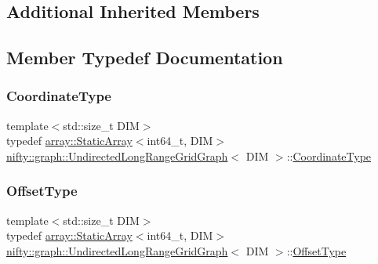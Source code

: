 \subsection*{Additional Inherited Members}


\subsection{Member Typedef Documentation}
\mbox{\label{classnifty_1_1graph_1_1UndirectedLongRangeGridGraph_a1a49e04a1f2c35151ca873ba859eddf0}} 
\subsubsection{\texorpdfstring{Coordinate\+Type}{CoordinateType}}
{\footnotesize\ttfamily template$<$std\+::size\+\_\+t D\+IM$>$ \\
typedef \hyperlink{namespacenifty_1_1array_a683f151f19c851754e0c6d55ed16a0c2}{array\+::\+Static\+Array}$<$int64\+\_\+t, D\+IM$>$ \hyperlink{classnifty_1_1graph_1_1UndirectedLongRangeGridGraph}{nifty\+::graph\+::\+Undirected\+Long\+Range\+Grid\+Graph}$<$ D\+IM $>$\+::\hyperlink{classnifty_1_1graph_1_1UndirectedLongRangeGridGraph_a1a49e04a1f2c35151ca873ba859eddf0}{Coordinate\+Type}}

\mbox{\label{classnifty_1_1graph_1_1UndirectedLongRangeGridGraph_a7fa465d2ce67dd437c9bbb18ea580012}} 
\subsubsection{\texorpdfstring{Offset\+Type}{OffsetType}}
{\footnotesize\ttfamily template$<$std\+::size\+\_\+t D\+IM$>$ \\
typedef \hyperlink{namespacenifty_1_1array_a683f151f19c851754e0c6d55ed16a0c2}{array\+::\+Static\+Array}$<$int64\+\_\+t, D\+IM$>$ \hyperlink{classnifty_1_1graph_1_1UndirectedLongRangeGridGraph}{nifty\+::graph\+::\+Undirected\+Long\+Range\+Grid\+Graph}$<$ D\+IM $>$\+::\hyperlink{classnifty_1_1graph_1_1UndirectedLongRangeGridGraph_a7fa465d2ce67dd437c9bbb18ea580012}{Offset\+Type}}

